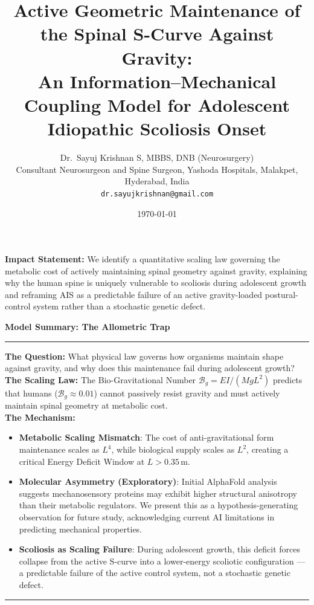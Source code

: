 \documentclass[11pt,a4paper]{article}
\title{Active Geometric Maintenance of the Spinal S-Curve Against Gravity:\\ An Information--Mechanical Coupling Model for Adolescent Idiopathic Scoliosis Onset}
\author{Dr.~Sayuj Krishnan S, MBBS, DNB (Neurosurgery)\\
Consultant Neurosurgeon and Spine Surgeon, Yashoda Hospitals, Malakpet, Hyderabad, India\\
\texttt{dr.sayujkrishnan@gmail.com}
}
\date{\today}
\newenvironment{mathbox}[1][]
 {\par\vspace{\baselineskip}\noindent\textbf{#1}\par\noindent\rule{\textwidth}{0.4pt}\par\noindent}
 {\par\noindent\rule{\textwidth}{0.4pt}\vspace{\baselineskip}\par}
\begin{document}
\linenumbers
\maketitle



\vspace{0.5em}
\noindent\textbf{Impact Statement:} We identify a quantitative scaling law governing the metabolic cost of actively maintaining spinal geometry against gravity, explaining why the human spine is uniquely vulnerable to scoliosis during adolescent growth and reframing AIS as a predictable failure of an active gravity-loaded postural-control system rather than a stochastic genetic defect.
\vspace{0.5em}

\begin{mathbox}[Model Summary: The Allometric Trap]
\textbf{The Question:} What physical law governs how organisms maintain shape against gravity, and why does this maintenance fail during adolescent growth?\\[4pt]
\textbf{The Scaling Law:} The Bio-Gravitational Number $\mathcal{B}_g = EI/(MgL^2)$ predicts that humans ($\mathcal{B}_g \approx 0.01$) cannot passively resist gravity and must actively maintain spinal geometry at metabolic cost.\\[4pt]
\textbf{The Mechanism:}
\begin{itemize}
    \item \textbf{Metabolic Scaling Mismatch}: The cost of anti-gravitational form maintenance scales as $L^4$, while biological supply scales as $L^2$, creating a critical Energy Deficit Window at $L > 0.35$\,m.
    \item \textbf{Molecular Asymmetry (Exploratory)}: Initial AlphaFold analysis suggests mechanosensory proteins may exhibit higher structural anisotropy than their metabolic regulators. We present this as a hypothesis-generating observation for future study, acknowledging current AI limitations in predicting mechanical properties.
    \item \textbf{Scoliosis as Scaling Failure}: During adolescent growth, this deficit forces collapse from the active S-curve into a lower-energy scoliotic configuration --- a predictable failure of the active control system, not a stochastic genetic defect.
\end{itemize}
\end{mathbox}


\end{document}

